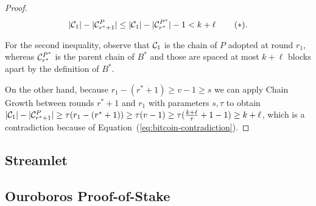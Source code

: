\begin{proof}
  \[
     |\mathcal{C}_1| - |\mathcal{C}^P_{r^* + 1}| \leq
     |\mathcal{C}_1| - |\mathcal{C}^{P^*}_{r^*}| - 1 <
     k + \ell\, \label{eq:bitcoin-contradiction}\tag{$\ast$}.
  \]

  For the second inequality, observe that
  $\mathcal{C}_1$ is the chain of $P$ adopted at round $r_1$,
  whereas $\mathcal{C}^{P^*}_{r^*}$ is
  the parent chain of $B^*$ and those are spaced at most $k + \ell$ blocks
  apart by the definition of $B^*$.

  On the other hand, because $r_1 - (r^* + 1) \geq v - 1 \geq s$ we can apply Chain Growth
  between rounds $r^* + 1$ and $r_1$
  with parameters $s, \tau$ to obtain
  $|\mathcal{C}_1| - |\mathcal{C}^P_{r^* + 1}| \geq \tau(r_1 - (r^* + 1)) \geq \tau (v - 1) \geq
  \tau (\frac{k + \ell}{\tau} + 1 - 1) \geq k + \ell$,
  which is a contradiction because of Equation~(\ref{eq:bitcoin-contradiction}).

  \Qed
\end{proof}

\subsection{Streamlet}


\subsection{Ouroboros Proof-of-Stake}

